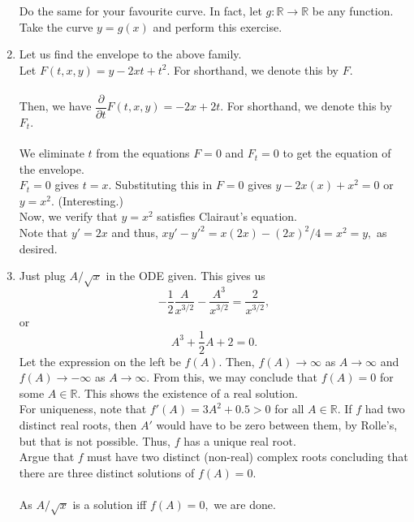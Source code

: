 \documentclass{article}
\begin{document}
\begin{enumerate}[label = Q.\arabic*.]
	Do the same for your favourite curve. In fact, let $g:\mathbb{R}\to\mathbb{R}$ be any function. Take the curve $y = g(x)$ and perform this exercise.
	\item Let us find the envelope to the above family.\\
	Let $F(t, x, y) = y - 2xt + t^2.$ For shorthand, we denote this by $F.$\\~\\
	Then, we have $\dfrac{\partial}{\partial t}F(t, x, y) = -2x + 2t.$ For shorthand, we denote this by $F_t.$\\~\\
	We eliminate $t$ from the equations $F = 0$ and $F_t = 0$ to get the equation of the envelope.\\
	$F_t = 0$ gives $t = x.$ Substituting this in $F = 0$ gives $y - 2x(x) + x^2 = 0$ or $y = x^2.$ \hfill (Interesting.)\\
	Now, we verify that $y = x^2$ satisfies Clairaut's equation.\\
	Note that $y' = 2x$ and thus, $xy' - y'^2 = x(2x) - (2x)^2/4 = x^2 = y,$ as desired.
	\item Just plug $A/\sqrt{x}$ in the ODE given. This gives us
	\[-\frac{1}{2}\frac{A}{x^{3/2}} - \frac{A^3}{x^{3/2}} = \dfrac{2}{x^{3/2}},\]
	or
	\[A^3 + \dfrac{1}{2}A + 2 = 0.\]
	Let the expression on the left be $f(A).$ Then, $f(A) \to \infty$ as $A \to \infty$ and $f(A) \to -\infty$ as $A \to \infty.$ From this, we may conclude that $f(A) = 0$ for some $A \in \mathbb{R}.$ This shows the existence of a real solution.\\
	For uniqueness, note that $f'(A) = 3A^2 + 0.5 > 0$ for all $A \in \mathbb{R}.$ If $f$ had two distinct real roots, then $A'$ would have to be zero between them, by Rolle's, but that is not possible. Thus, $f$ has a unique real root.\\
	Argue that $f$ must have two distinct (non-real) complex roots concluding that there are three distinct solutions of $f(A) = 0.$\\~\\
	As $A/\sqrt{x}$ is a solution iff $f(A) = 0,$ we are done.
\end{enumerate}
\end{document}
